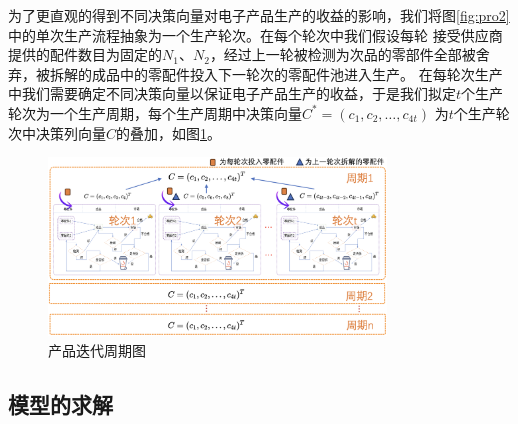 \documentclass[withoutpreface,bwprint]{cumcmthesis} %
\begin{document}
为了更直观的得到不同决策向量对电子产品生产的收益的影响，我们将图\ref{fig:pro2}中的单次生产流程抽象为一个生产轮次。在每个轮次中我们假设每轮
接受供应商提供的配件数目为固定的$N_{1}$、$N_{2}$，经过上一轮被检测为次品的零部件全部被舍弃，被拆解的成品中的零配件投入下一轮次的零配件池进入生产。
在每轮次生产中我们需要确定不同决策向量以保证电子产品生产的收益，于是我们拟定$t$个生产轮次为一个生产周期，每个生产周期中决策向量$C^{*}=(c_{1},c_{2},\dots,c_{4t})$
为$t$个生产轮次中决策列向量$C$的叠加，如图\ref{fig:pro2-2}。
\begin{figure}[H]
    \centering
    \includegraphics[width=0.8\textwidth]{Fig/pro2-2.png}      %
    \caption{产品迭代周期图}
    \label{fig:pro2-2}
\end{figure}

\subsection{模型的求解}
\end{document}
